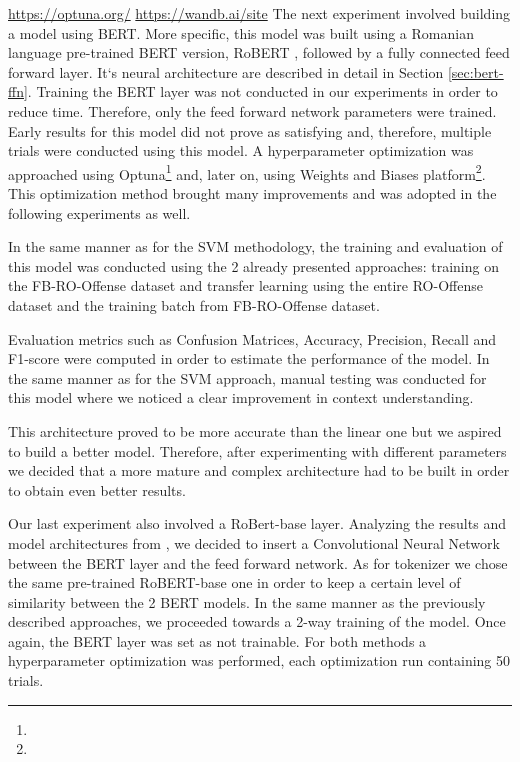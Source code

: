 \documentclass[12pt,a4paper]{report}
\begin{document}
\urldef{\urlOptuna}\url{https://optuna.org/}
\urldef{\urlWANDB}\url{https://wandb.ai/site}
The next experiment involved building a model using BERT. More specific, this model was built using a Romanian language pre-trained BERT version, RoBERT \citep{masala2020robert}, followed by a fully connected feed forward layer. It`s neural architecture are described in detail in Section \ref{sec:bert-ffn}.
Training the BERT layer was not conducted in our experiments in order to reduce time. Therefore, only the feed forward network parameters were trained.
Early results for this model did not prove as satisfying and, therefore, multiple trials were conducted using this model. A hyperparameter optimization was approached using Optuna\footnote{\urlOptuna} and, later on, using Weights and Biases platform\footnote{\urlWANDB}. This optimization method brought many improvements and was adopted in the following experiments as well.

In the same manner as for the SVM methodology, the training and evaluation of this model was conducted using the 2 already presented approaches: training on the FB-RO-Offense dataset and transfer learning using the entire RO-Offense dataset and the training batch from FB-RO-Offense dataset.

Evaluation metrics such as Confusion Matrices, Accuracy, Precision, Recall and F1-score were computed in order to estimate the performance of the model. In the same manner as for the SVM approach, manual testing was conducted for this model where we noticed a clear improvement in context understanding.

This architecture proved to be more accurate than the linear one but we aspired to build a better model. Therefore, after experimenting with different parameters we decided that a more mature and complex architecture had to be built in order to obtain even better results.


Our last experiment also involved a RoBert-base layer. Analyzing the results and model architectures from \citet{safaya2020kuisail}, we decided to insert a Convolutional Neural Network between the BERT layer and the feed forward network. As for tokenizer we chose the same pre-trained RoBERT-base one in order to keep a certain level of similarity between the 2 BERT models. In the same manner as the previously described approaches, we proceeded towards a 2-way training of the model. Once again, the BERT layer was set as not trainable. For both methods a hyperparameter optimization was performed, each optimization run containing 50 trials.
\end{document}

